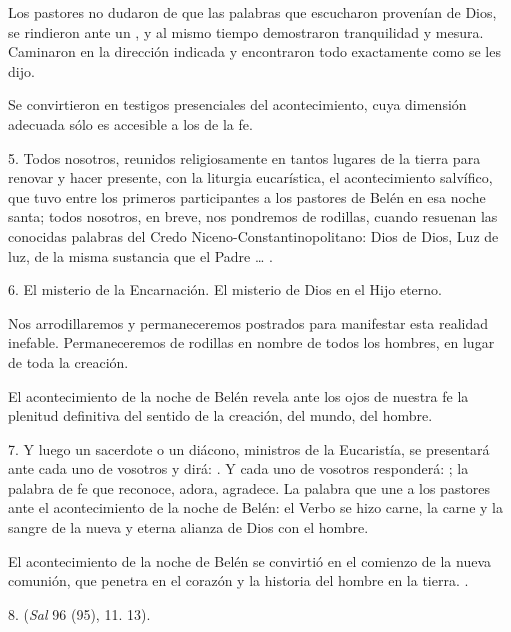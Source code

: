 \begin{body}
\begin{body}
		Los pastores no dudaron de que las palabras que escucharon provenían de Dios, se rindieron ante un , y al mismo tiempo demostraron tranquilidad y mesura. Caminaron en la dirección indicada y encontraron todo exactamente como se les dijo.

		Se convirtieron en testigos presenciales del acontecimiento, cuya dimensión adecuada sólo es accesible a los  de la fe.

		5. Todos nosotros, reunidos religiosamente en tantos lugares de la tierra para renovar y hacer presente, con la liturgia eucarística, el acontecimiento salvífico, que tuvo entre los primeros participantes a los pastores de Belén en esa noche santa; todos nosotros, en breve, nos pondremos de rodillas, cuando resuenan las conocidas palabras del Credo Niceno-Constantinopolitano: Dios de Dios, Luz de luz, de la misma sustancia que el Padre \ldots{} .

		6. El misterio de la Encarnación. El misterio de Dios  en el Hijo eterno.

		Nos arrodillaremos y permaneceremos postrados para manifestar esta realidad inefable. Permaneceremos de rodillas en nombre de todos los hombres, en lugar de toda la creación.

		El acontecimiento de la noche de Belén revela ante los ojos de nuestra fe la plenitud definitiva del sentido de la creación, del mundo, del hombre.

		7. Y luego un sacerdote o un diácono, ministros de la Eucaristía, se presentará ante cada uno de vosotros y dirá: . Y cada uno de vosotros responderá: ; la palabra de fe que reconoce, adora, agradece. La palabra que une a los pastores ante el acontecimiento de la noche de Belén: el Verbo se hizo carne, la carne y la sangre de la nueva y eterna alianza de Dios con el hombre.

		El acontecimiento de la noche de Belén se convirtió en el comienzo de la nueva comunión, que penetra en el corazón y la historia del hombre en la tierra. .

		8.  (\emph{Sal} 96 (95), 11. 13).


\end{body}
\end{body}
